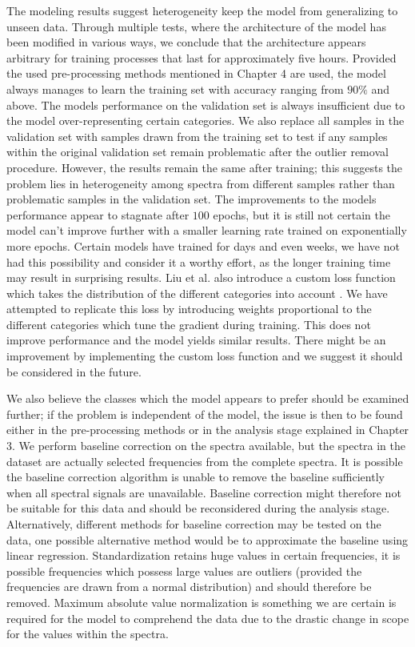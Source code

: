 The modeling results suggest heterogeneity keep the model from generalizing to unseen data. Through multiple tests, where the architecture of the model has been modified in various ways, we conclude that the architecture appears arbitrary for training processes that last for approximately five hours. Provided the used pre-processing methods mentioned in Chapter 4 are used, the model always manages to learn the training set with accuracy ranging from $90\%$ and above. The models performance on the validation set is always insufficient due to the model over-representing certain categories. We also replace all samples in the validation set with samples drawn from the training set to test if any samples within the original validation set remain problematic after the outlier removal procedure. However, the results remain the same after training; this suggests the problem lies in heterogeneity among spectra from different samples rather than problematic samples in the validation set. The improvements to the models performance appear to stagnate after $100$ epochs, but it is still not certain the model can't improve further with a smaller learning rate trained on exponentially more epochs. Certain models have trained for days and even weeks, we have not had this possibility and consider it a worthy effort, as the longer training time may result in surprising results. Liu et al. also introduce a custom loss function which takes the distribution of the different categories into account \cite{liu2017deep}. We have attempted to replicate this loss by introducing weights proportional to the different categories which tune the gradient during training. This does not improve performance and the model yields similar results. There might be an improvement by implementing the custom loss function and we suggest it should be considered in the future.

We also believe the classes which the model appears to prefer should be examined further; if the problem is independent of the model, the issue is then to be found either in the pre-processing methods or in the analysis stage explained in Chapter 3. We perform baseline correction on the spectra available, but the spectra in the dataset are actually selected frequencies from the complete spectra. It is possible the baseline correction algorithm is unable to remove the baseline sufficiently when all spectral signals are unavailable. Baseline correction might therefore not be suitable for this data and should be reconsidered during the analysis stage. Alternatively, different methods for baseline correction may be tested on the data, one possible alternative method would be to approximate the baseline using linear regression. Standardization retains huge values in certain frequencies, it is possible frequencies which possess large values are outliers (provided the frequencies are drawn from a normal distribution) and should therefore be removed. Maximum absolute value normalization is something we are certain is required for the model to comprehend the data due to the drastic change in scope for the values within the spectra.

